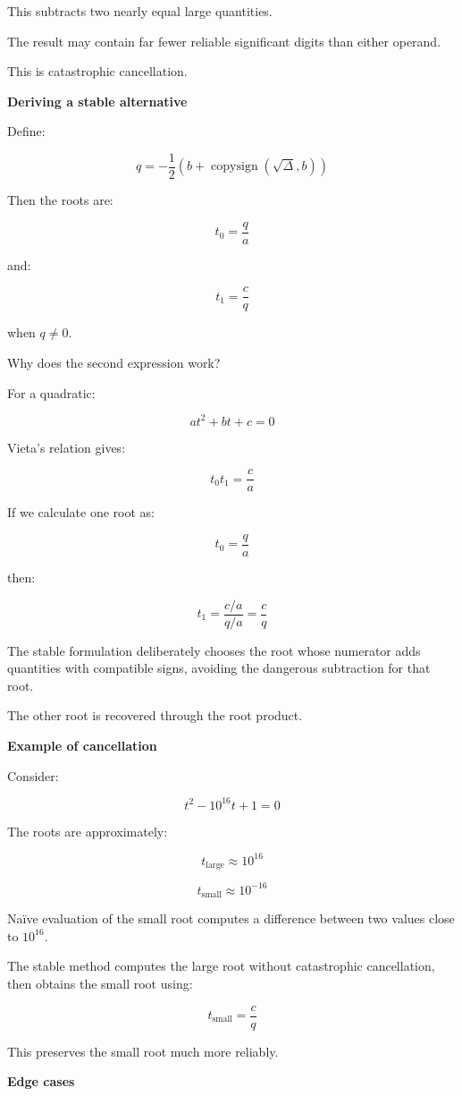 This subtracts two nearly equal large quantities.

The result may contain far fewer reliable significant digits than either operand.

This is catastrophic cancellation.

\textbf{Deriving a stable alternative}

Define:

\[
\boxed{ q=-\frac12\left(b+\operatorname{copysign}(\sqrt{\Delta},b)\right) }
\]

Then the roots are:

\[
\boxed{ t_0=\frac qa }
\]

and:

\[
\boxed{ t_1=\frac cq }
\]

when \(q\ne0\).

Why does the second expression work?

For a quadratic:

\[
at^2+bt+c=0
\]

Vieta's relation gives:

\[
t_0t_1=\frac ca
\]

If we calculate one root as:

\[
t_0=\frac qa
\]

then:

\[
t_1=\frac{c/a}{q/a}=\frac cq
\]

The stable formulation deliberately chooses the root whose numerator adds quantities with compatible signs, avoiding the dangerous subtraction for that root.

The other root is recovered through the root product.

\textbf{Example of cancellation}

Consider:

\[
t^2-10^{16}t+1=0
\]

The roots are approximately:

\[
t_{\mathrm{large}}\approx10^{16}
\]

\[
t_{\mathrm{small}}\approx10^{-16}
\]

Naïve evaluation of the small root computes a difference between two values close to \(10^{16}\).

The stable method computes the large root without catastrophic cancellation, then obtains the small root using:

\[
t_{\mathrm{small}}=\frac c q
\]

This preserves the small root much more reliably.

\textbf{Edge cases}

